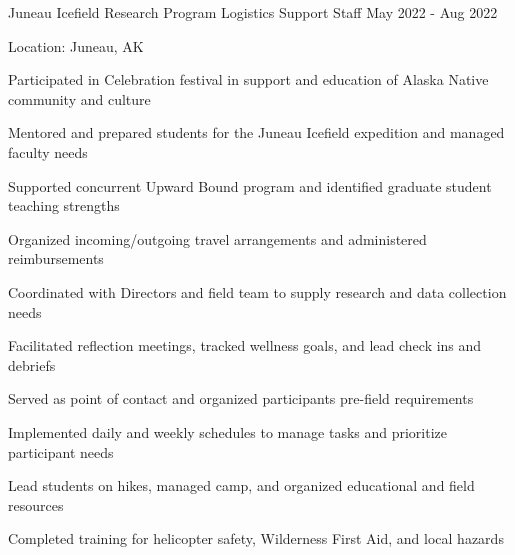 \documentclass{../styles/cv}
\begin{document}
\subsectionpositiondate
    {Juneau Icefield Research Program}
    {Logistics Support Staff}
    {May 2022 - Aug 2022}
\resumesublistbegin
    \item Location: Juneau, AK
    \item Participated in Celebration festival in support and education of Alaska Native community and culture
    \item Mentored and prepared students for the Juneau Icefield expedition and managed faculty needs
    \item Supported concurrent Upward Bound program and identified graduate student teaching strengths
    \item Organized incoming/outgoing travel arrangements and administered reimbursements
    \item Coordinated with Directors and field team to supply research and data collection needs
    \item Facilitated reflection meetings, tracked wellness goals, and lead check ins and debriefs
    \item Served as point of contact and organized participants pre-field requirements
    \item Implemented daily and weekly schedules to manage tasks and prioritize participant needs
    \item Lead students on hikes, managed camp, and organized educational and field resources
    \item Completed training for helicopter safety, Wilderness First Aid, and local hazards
\resumesublistend
\end{document}
